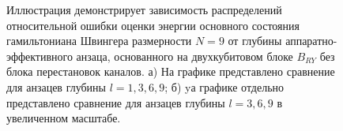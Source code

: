 \documentclass[14pt]{extarticle}
\begin{document}
\begin{figure}[H]
\begin{minipage}[H]{0.48\linewidth}
\end{minipage}
\hfill
\begin{minipage}[H]{0.48\linewidth}
\end{minipage}
\caption{Иллюстрация демонстрирует зависимость распределений относительной ошибки оценки энергии основного состояния гамильтониана Швингера размерности $N = 9$ от глубины аппаратно-эффективного анзаца, основанного на двухкубитовом блоке $B_{RY}$ без блока перестановок каналов. а) На графике представлено сравнение для анзацев глубины $l = 1,3,6,9$; б) yа графике отдельно представлено сравнение для анзацев глубины $l = 3,6,9$ в увеличенном масштабе.}\label{fig:fidelity_layers}
\end{figure}
\end{document}

